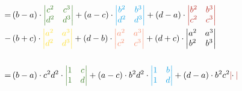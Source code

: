 \documentclass[main.tex]{subfiles}
\begin{document}
\begin{align*}
    =& 
    \left( b - a \right) \cdot \textcolor{OliveGreen}{\begin{vmatrix}
        c^2 & c^3 \\
        d^2 & d^3 \\
    \end{vmatrix}} 
    + \left( a - c \right) \cdot
    \textcolor{Cerulean}{\begin{vmatrix}
        b^2 & b^3 \\
        d^2 & d^3 \\
    \end{vmatrix}}
    + \left( d - a \right) \cdot
    \textcolor{BrickRed}{\begin{vmatrix}
        b^2 & b^3 \\
        c^2 & c^3 \\
    \end{vmatrix}}\\
    -& \left( b + c \right) \cdot
    \textcolor{Goldenrod}{\begin{vmatrix}
        a^2 & a^3 \\
        d^2 & d^3 \\
    \end{vmatrix}}
    + \left( d - b \right) \cdot
    \textcolor{Melon}{\begin{vmatrix}
        a^2 & a^3 \\
        c^2 & c^3 \\
    \end{vmatrix}}
    + \left( d + c \right) \cdot
    \begin{vmatrix}
        a^2 & a^3 \\
        b^2 & b^3 \\
    \end{vmatrix}\\
    \\
    =& 
    \left( b - a \right) \cdot c^2 d^2 \cdot \textcolor{OliveGreen}{\begin{vmatrix}
        1 & c \\
        1 & d \\
    \end{vmatrix}} 
    + \left( a - c \right) \cdot b^2 d^2 \cdot
    \textcolor{Cerulean}{\begin{vmatrix}
        1 & b \\
        1 & d \\
    \end{vmatrix}}
    + \left( d - a \right) \cdot b^2 c^2 \cdot
    \textcolor{BrickRed}{\begin{vmatrix}

\end{vmatrix}}
\end{align*}
\end{document}

